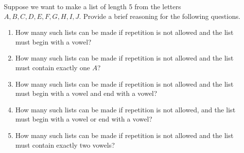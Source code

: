 \documentclass{article}
\theoremstyle{definition}
\begin{document}
\begin{question}{10}
    Suppose we want to make a list of length 5 from the letters \\$A, B, C, D, E, F, G, H, I, J$. Provide a brief reasoning for the following questions.
        \begin{enumerate}
            \item How many such lists can be made if repetition is not allowed and the list must begin with a vowel?
            \item How many such lists can be made if repetition is not allowed and the list must contain exactly one $A$?
            \item How many such lists can be made if repetition is not allowed and the list must begin with a vowel and end with a vowel?
            \item How many such lists can be made if repetition is not allowed, and the list must begin with a vowel or end with a vowel?
            \item How many such lists can be made if repetition is not allowed and the list must contain exactly two vowels?
        \end{enumerate}
\end{question}
\end{document}
